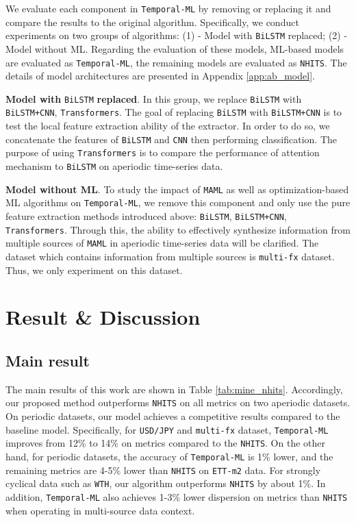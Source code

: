 \documentclass[a4paper,fleqn]{cas-sc}
\begin{document}
We evaluate each component in \verb|Temporal-ML| by removing or replacing it and compare the results to the original algorithm. Specifically, we conduct experiments on two groups of algorithms: (1) - Model with \verb|BiLSTM| replaced; (2) - Model without ML. Regarding the evaluation of these models, ML-based models are evaluated as \verb|Temporal-ML|, the remaining models are evaluated as \verb|NHITS|. The details of model architectures are presented in Appendix \ref{app:ab_model}.

\vspace{1mm}

\textbf{Model with} \verb|BiLSTM| \textbf{replaced}. In this group, we replace \verb|BiLSTM| with \verb|BiLSTM+CNN|, \verb|Transformers|. The goal of replacing \verb|BiLSTM| with \verb|BiLSTM+CNN| is to test the local feature extraction ability of the extractor. In order to do so, we concatenate the features of \verb|BiLSTM| and \verb|CNN| then performing classification. The purpose of using \verb|Transformers| is to compare the performance of attention mechanism to \verb|BiLSTM| on aperiodic time-series data.

\vspace{1mm}

\textbf{Model without ML}. To study the impact of \verb|MAML| as well as optimization-based ML algorithms on \verb|Temporal-ML|, we remove this component and only use the pure feature extraction methods introduced above: \verb|BiLSTM|, \verb|BiLSTM+CNN|, \verb|Transformers|. Through this, the ability to effectively synthesize information from multiple sources of \verb|MAML| in aperiodic time-series data will be clarified. The dataset which contains information from multiple sources is \verb|multi-fx| dataset. Thus, we only experiment on this dataset.

\section{Result \& Discussion}

\subsection{Main result}

The main results of this work are shown in Table \ref{tab:mine_nhits}. Accordingly, our proposed method outperforms \verb|NHITS| on all metrics on two aperiodic datasets. On periodic datasets, our model achieves a competitive results compared to the baseline model. Specifically, for \verb|USD/JPY| and \verb|multi-fx| dataset, \verb|Temporal-ML| improves from 12\% to 14\% on metrics compared to the \verb|NHITS|. On the other hand, for periodic datasets, the accuracy of \verb|Temporal-ML| is 1\% lower, and the remaining metrics are 4-5\% lower than \verb|NHITS| on \verb|ETT-m2| data. For strongly cyclical data such as \verb|WTH|, our algorithm outperforms \verb|NHITS| by about 1\%. In addition, \verb|Temporal-ML| also achieves 1-3\% lower dispersion on metrics than \verb|NHITS| when operating in multi-source data context.
\end{document}
